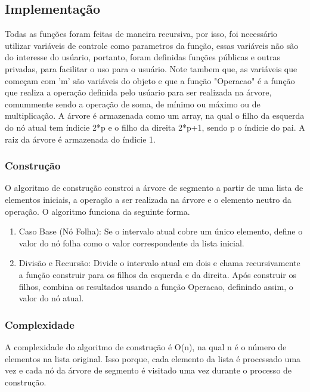 \documentclass{article}
\begin{document}
\subsection{Implementação}
Todas as funções foram feitas de maneira recursiva, por isso, foi necessário utilizar variáveis de controle como parametros da função,
essas variáveis não são do interesse do usúario, portanto, foram definidas funções públicas e outras privadas, para facilitar o uso para o usuário. 
Note tambem que, as variáveis 
que começam com 'm' são variáveis do objeto e que a função "Operacao" é a função que realiza a operação definida pelo usúario para ser realizada
na árvore, comummente sendo a operação de soma, de mínimo ou máximo ou de multiplicação. A árvore é armazenada como um array, na qual o filho da 
esquerda do nó atual tem índicie 2*p e o filho da direita 2*p+1, sendo p o índicie do pai. A raiz da árvore é armazenada do índicie 1.

\subsubsection{Construção}
O algoritmo de construção constroi a árvore de segmento a partir de uma lista de elementos iniciais, a operação a ser realizada na árvore e o elemento
neutro da operação.
O algoritmo funciona da seguinte forma.
\begin{enumerate}
  \item Caso Base (Nó Folha): Se o intervalo atual cobre um único elemento, define o valor do nó folha como o valor correspondente da lista inicial.
  \item Divisão e Recursão: Divide o intervalo atual em dois e chama recursivamente a função construir para os filhos da esquerda e da direita. Após construir os filhos, combina os resultados usando a função Operacao, definindo assim, o valor do nó atual.
\end{enumerate}
\subsubsection{Complexidade}
A complexidade do algoritmo de construção é O(n), na qual n é o número de elementos na lista original.
Isso porque, cada elemento da lista é processado uma vez e cada nó da árvore de segmento é visitado uma vez durante o processo de construção.
\end{document}
